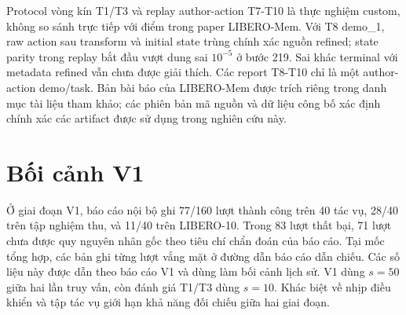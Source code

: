 \clearpage
Protocol vòng kín T1/T3 và replay author-action T7-T10 là thực nghiệm custom, không so sánh trực tiếp với điểm trong paper LIBERO-Mem. Với T8 demo\_1, raw action sau transform và initial state trùng chính xác nguồn refined; state parity trong replay bắt đầu vượt dung sai $10^{-5}$ ở bước 219. Sai khác terminal với metadata refined vẫn chưa được giải thích. Các report T8-T10 chỉ là một author-action demo/task. Bản bài báo của LIBERO-Mem được trích riêng trong danh mục tài liệu tham khảo; các phiên bản mã nguồn và dữ liệu công bố xác định chính xác các artifact được sử dụng trong nghiên cứu này.

\section{Bối cảnh V1}
Ở giai đoạn V1, báo cáo nội bộ ghi 77/160 lượt thành công trên 40 tác vụ,
28/40 trên tập nghiệm thu, và 11/40 trên LIBERO-10. Trong 83 lượt thất bại,
71 lượt chưa được quy nguyên nhân gốc theo tiêu chí chẩn đoán của báo cáo.
Tại mốc tổng hợp, các bản ghi từng lượt vắng mặt ở đường dẫn báo cáo dẫn chiếu.
Các số liệu này được dẫn theo báo cáo V1 và dùng làm bối cảnh lịch sử.
V1 dùng $s=50$ giữa hai lần truy vấn, còn đánh giá T1/T3 dùng $s=10$.
Khác biệt về nhịp điều khiển và tập tác vụ giới hạn khả năng đối chiếu giữa hai giai đoạn.

